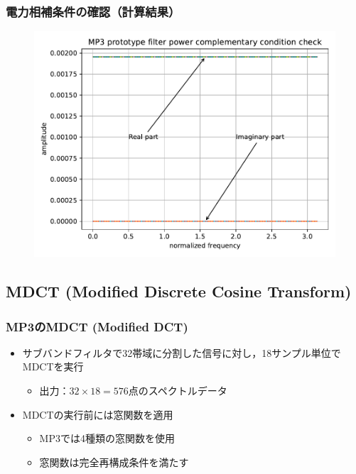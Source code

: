 \documentclass[14pt,xcolor=dvipsnames,table,dvipdfmx]{beamer}
\begin{document}
\begin{frame}[c]
    \frametitle{電力相補条件の確認（計算結果）}
    \begin{figure}
        \includegraphics[width=115mm]{./figs/mp3_encoder_prototype_filter_power_complementary_condition.pdf}
    \end{figure}
\end{frame}

\subsection{MDCT (Modified Discrete Cosine Transform)}

\begin{frame}[c]
    \frametitle{MP3のMDCT (Modified DCT)}
    \begin{itemize}
        \item サブバンドフィルタで32帯域に分割した信号に対し，18サンプル単位でMDCTを実行
            \begin{itemize}
                \item 出力：$32 \times 18 = 576$点のスペクトルデータ
            \end{itemize}
        \item MDCTの実行前には窓関数を適用
            \begin{itemize}
                \item MP3では4種類の窓関数を使用
                \item 窓関数は完全再構成条件を満たす
            \end{itemize}
    \end{itemize}
\end{frame}
\end{document}
